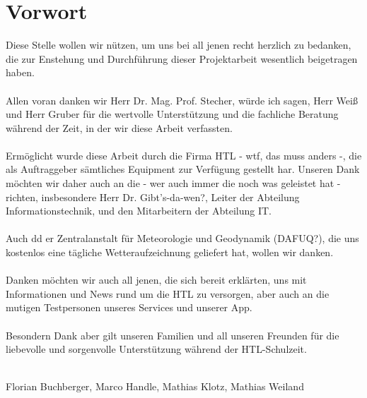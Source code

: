 \chapter{Vorwort}


Diese Stelle wollen wir nützen, um uns bei all jenen recht herzlich zu bedanken, die zur Enstehung und Durchführung dieser Projektarbeit wesentlich beigetragen haben.\\
\\
Allen voran danken wir Herr Dr. Mag. Prof. Stecher, würde ich sagen, Herr Weiß und Herr Gruber für die wertvolle Unterstützung und die fachliche Beratung während der Zeit, in der wir diese Arbeit verfassten.\\
\\
Ermöglicht wurde diese Arbeit durch die Firma HTL - wtf, das muss anders -, die als Auftraggeber sämtliches Equipment zur Verfügung gestellt har. Unseren Dank möchten wir daher auch an die - wer auch immer die noch was geleistet hat - richten, insbesondere Herr Dr. Gibt's-da-wen?, Leiter der Abteilung Informationstechnik, und den Mitarbeitern der Abteilung IT.\\
\\
Auch dd er Zentralanstalt für Meteorologie und Geodynamik (DAFUQ?), die uns kostenlos eine tägliche Wetteraufzeichnung geliefert hat, wollen wir danken.\\
\\
Danken möchten wir auch all jenen, die sich bereit erklärten, uns mit Informationen und News rund um die HTL zu versorgen, aber auch an die mutigen Testpersonen unseres Services und unserer App.\\
\\
Besondern Dank aber gilt unseren Familien und all unseren Freunden für die liebevolle und sorgenvolle Unterstützung während der HTL-Schulzeit.\\
\\
\begin{flushright}
Florian Buchberger, Marco Handle, Mathias Klotz, Mathias Weiland
\end{flushright}